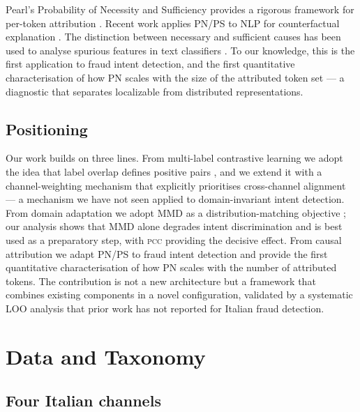 \documentclass[preprint,12pt,authoryear]{elsarticle}
\newcommand{\pcc}{\textsc{pcc}}
\begin{document}
Pearl's Probability of Necessity and Sufficiency provides a rigorous
framework for per-token attribution \citep{pearl2009causality}.
Recent work applies PN/PS to NLP for counterfactual explanation
\citep{cheng2025cpns,kaushik2020learning,feder2022causal}. The
distinction between necessary and sufficient causes has been used to
analyse spurious features in text classifiers
\citep{joshi2022spurious}. To our knowledge, this is the first
application to fraud intent detection, and the first quantitative
characterisation of how PN scales with the size of the attributed
token set --- a diagnostic that separates localizable from
distributed representations.

\subsection{Positioning}
\label{sec:positioning}

Our work builds on three lines. From multi-label contrastive
learning we adopt the idea that label overlap defines positive pairs
\citep{audibert2025multilabel}, and we extend it with a
channel-weighting mechanism that explicitly prioritises cross-channel
alignment --- a mechanism we have not seen applied to
domain-invariant intent detection. From domain adaptation we adopt
MMD as a distribution-matching objective
\citep{gretton2012mmd,long2015dan}; our analysis shows that MMD
alone degrades intent discrimination and is best used as a
preparatory step, with \pcc{} providing the decisive effect. From
causal attribution we adapt PN/PS
\citep{pearl2009causality,cheng2025cpns} to fraud intent detection
and provide the first quantitative characterisation of how PN scales
with the number of attributed tokens. The contribution is not a new
architecture but a framework that combines existing components in a
novel configuration, validated by a systematic LOO analysis that
prior work has not reported for Italian fraud detection.

\section{Data and Taxonomy}
\label{sec:data}

\subsection{Four Italian channels}
\end{document}
